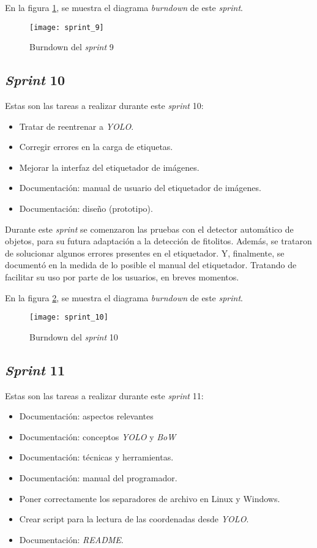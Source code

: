 En la figura \ref{fig:A.1.10}, se muestra el diagrama \textit{burndown} de este \textit{sprint}.

\begin{figure}
\centering
\texttt{[image: sprint\_9]}
\caption{Burndown del \textit{sprint} 9}
\label{fig:A.1.10}
\end{figure}


\subsection{\textit{Sprint} 10}

Estas son las tareas a realizar durante este \textit{sprint} 10:

\begin{itemize}
	\item Tratar de reentrenar a \textit{YOLO}.
	\item Corregir errores en la carga de etiquetas.
	\item Mejorar la interfaz del etiquetador de imágenes.
	\item Documentación: manual de usuario del etiquetador de imágenes.
	\item Documentación: diseño (prototipo).
\end{itemize}

Durante este \textit{sprint} se comenzaron las pruebas con el detector automático de objetos, para su futura adaptación a la detección de fitolitos. Además, se trataron de solucionar algunos errores presentes en el etiquetador. Y, finalmente, se documentó en la medida de lo posible el manual del etiquetador. Tratando de facilitar su uso por parte de los usuarios, en breves momentos.

En la figura \ref{fig:A.1.11}, se muestra el diagrama \textit{burndown} de este \textit{sprint}.

\begin{figure}
\centering
\texttt{[image: sprint\_10]}
\caption{Burndown del \textit{sprint} 10}
\label{fig:A.1.11}
\end{figure}

\subsection{\textit{Sprint} 11}

Estas son las tareas a realizar durante este \textit{sprint} 11:

\begin{itemize}
	\item Documentación: aspectos relevantes
	\item Documentación: conceptos \textit{YOLO} y \textit{BoW}
	\item Documentación: técnicas y herramientas.
	\item Documentación: manual del programador.
	\item Poner correctamente los separadores de archivo en Linux y Windows.
	\item Crear script para la lectura de las coordenadas desde \textit{YOLO}.
	\item Documentación: \textit{README}.
\end{itemize}

